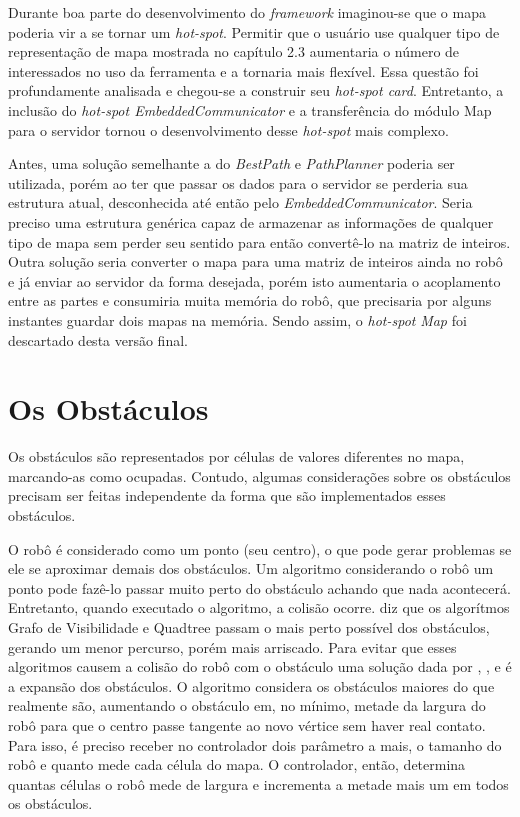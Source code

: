 Durante boa parte do desenvolvimento do \textit{framework} imaginou-se que o mapa poderia vir a se tornar um \textit{hot-spot}. Permitir que o usuário use qualquer tipo de representação de mapa mostrada no capítulo 2.3 aumentaria o número de interessados no uso da ferramenta e a tornaria mais flexível. Essa questão foi profundamente analisada e chegou-se a construir seu \textit{hot-spot card}. Entretanto, a inclusão do \textit{hot-spot EmbeddedCommunicator} e a transferência do módulo Map para o servidor tornou o desenvolvimento desse \textit{hot-spot} mais complexo. 

Antes, uma solução semelhante a do \textit{BestPath} e \textit{PathPlanner} poderia ser utilizada, porém ao ter que passar os dados para o servidor se perderia sua estrutura atual, desconhecida até então pelo \textit{EmbeddedCommunicator}. Seria preciso uma estrutura genérica capaz de armazenar as informações de qualquer tipo de mapa sem perder seu sentido para então convertê-lo na matriz de inteiros. Outra solução seria converter o mapa para uma matriz de inteiros ainda no robô e já enviar ao servidor da forma desejada, porém isto aumentaria o acoplamento entre as partes e consumiria muita memória do robô, que precisaria por alguns instantes guardar dois mapas na memória. Sendo assim, o \textit{hot-spot} \textit{Map} foi descartado desta versão final.

\section{Os Obstáculos}

Os obstáculos são representados por células de valores diferentes no mapa, marcando-as como ocupadas. Contudo, algumas considerações sobre os obstáculos precisam ser feitas independente da forma que são implementados esses obstáculos.

O robô é considerado como um ponto (seu centro), o que pode gerar problemas se ele se aproximar demais dos obstáculos. Um algoritmo considerando o robô um ponto pode fazê-lo passar muito perto do obstáculo achando que nada acontecerá. Entretanto, quando executado o algoritmo, a colisão ocorre. \cite{Guzman2008} diz que os algorítmos Grafo de Visibilidade e Quadtree passam o mais perto possível dos obstáculos, gerando um menor percurso, porém mais arriscado. Para evitar que esses algoritmos causem a colisão do robô com o obstáculo uma solução dada por \cite{Souza2008}, \cite{Guzman2008}, \cite{Siegwart2004} e \cite{Thomsen2010} é a expansão dos obstáculos. O algoritmo considera os obstáculos maiores do que realmente são, aumentando o obstáculo em, no mínimo, metade da largura do robô para que o centro passe tangente ao novo vértice sem haver real contato. Para isso, é preciso receber no controlador dois parâmetro a mais, o tamanho do robô e quanto mede cada célula do mapa. O controlador, então, determina quantas células o robô mede de largura e incrementa a metade mais um em todos os obstáculos.

